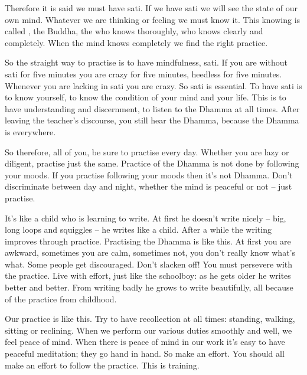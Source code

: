 Therefore it is said we must have sati. If we have sati we will see the state of our own mind. Whatever we are thinking or feeling we must know it. This knowing is called , the Buddha, the  who knows thoroughly, who knows clearly and completely. When the mind knows completely we find the right practice.

So the straight way to practise is to have mindfulness, sati. If you are without sati for five minutes you are crazy for five minutes, heedless for five minutes. Whenever you are lacking in sati you are crazy. So sati is essential. To have sati is to know yourself, to know the condition of your mind and your life. This is to have understanding and discernment, to listen to the Dhamma at all times. After leaving the teacher's discourse, you still hear the Dhamma, because the Dhamma is everywhere.

So therefore, all of you, be sure to practise every day. Whether you are lazy or diligent, practise just the same. Practice of the Dhamma is not done by following your moods. If you practise following your moods then it's not Dhamma. Don't discriminate between day and night, whether the mind is peaceful or not -- just practise.

It's like a child who is learning to write. At first he doesn't write nicely -- big, long loops and squiggles -- he writes like a child. After a while the writing improves through practice. Practising the Dhamma is like this. At first you are awkward, sometimes you are calm, sometimes not, you don't really know what's what. Some people get discouraged. Don't slacken off! You must persevere with the practice. Live with effort, just like the schoolboy: as he gets older he writes better and better. From writing badly he grows to write beautifully, all because of the practice from childhood.

Our practice is like this. Try to have recollection at all times: standing, walking, sitting or reclining. When we perform our various duties smoothly and well, we feel peace of mind. When there is peace of mind in our work it's easy to have peaceful meditation; they go hand in hand. So make an effort. You should all make an effort to follow the practice. This is training.

